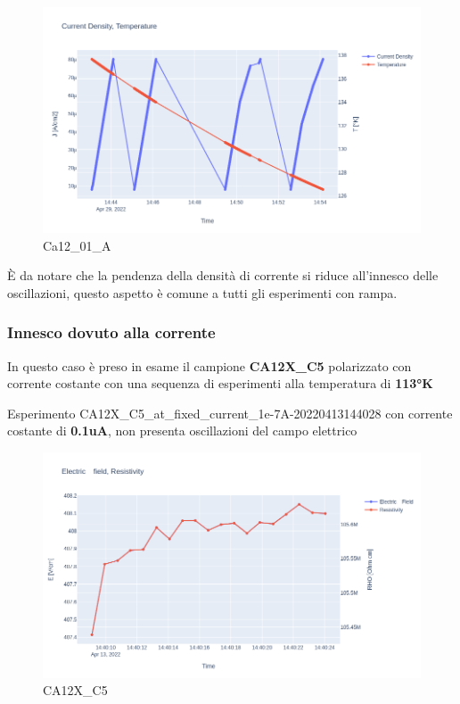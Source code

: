 \documentclass[11pt]{article}
\begin{document}
\begin{figure}
\centering
\includegraphics{ca12_01_a-j_t.png}
\caption{Ca12\_01\_A}
\end{figure}

È da notare che la pendenza della densità di corrente si riduce
all'innesco delle oscillazioni, questo aspetto è comune a tutti gli
esperimenti con rampa.

    \hypertarget{innesco-dovuto-alla-corrente}{%
\subsubsection{Innesco dovuto alla
corrente}\label{innesco-dovuto-alla-corrente}}

In questo caso è preso in esame il campione \textbf{CA12X\_C5}
polarizzato con corrente costante con una sequenza di esperimenti alla
temperatura di \textbf{113°K}

Esperimento CA12X\_C5\_at\_fixed\_current\_1e-7A-20220413144028 con
corrente costante di \textbf{0.1uA}, non presenta oscillazioni del campo
elettrico

\begin{figure}
\centering
\includegraphics{CA12X_C5-1.png}
\caption{CA12X\_C5}
\end{figure}
\end{document}
